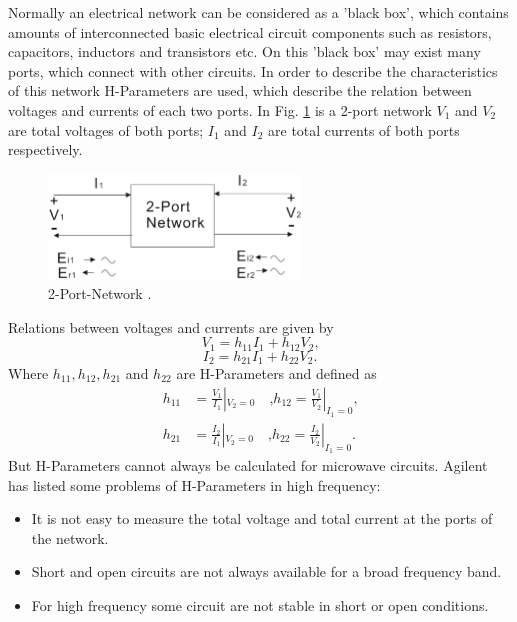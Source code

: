 Normally an electrical network can be considered as a 'black box', which contains amounts of interconnected basic electrical circuit components such as resistors, capacitors, inductors and transistors etc. On this 'black box' may exist many ports, which connect with other circuits. In order to describe the characteristics of this network H-Parameters are used, which describe the relation between voltages and currents of each two ports. In Fig. \ref{fig:2_port_network} is a 2-port network $V_{1}$ and $V_{2}$ are total voltages of both ports; $I_{1}$ and $I_{2}$ are total currents of both ports respectively.\\
 
\begin{figure}[!ht]
\centering
\includegraphics[width=0.6\textwidth]{bilder/s_parameters}
\caption{2-Port-Network \cite{aglient_s_parameters}.}
\label{fig:2_port_network}
\end{figure}
Relations between voltages and currents are given by %
\begin{equation}
V_{1}=h_{11}I_{1}+h_{12}V_{2} \text{,}
\label{eq:voltage_current1}
\end{equation}
\begin{equation}
I_{2}=h_{21}I_{1}+h_{22}V_{2} \text{.}
\label{eq:voltage_current2}
\end{equation}
Where $h_{11},h_{12},h_{21}$ and $h_{22}$ are H-Parameters and defined as %
\begin{align}
h_{11}&=\frac{V_{1}}{I_{1}}|_{V_{2}=0}\quad\text{,} h_{12}=\frac{V_{1}}{V_{2}}|_{I_{1}=0}\text{,}
\label{eq:h_parameters1}\\
h_{21}&=\frac{I_{2}}{I_{1}}|_{V_{2}=0}\quad\text{,} h_{22}=\frac{I_{2}}{V_{2}}|_{I_{1}=0}\text{.}
\label{eq:h_parameters2}
\end{align}
But H-Parameters cannot always be calculated for microwave circuits. Agilent\cite{aglient_s_parameters} has listed some problems of H-Parameters in high frequency:
\begin{itemize}
\item It is not easy to measure the total voltage and total current at the ports of the network.
\item Short and open circuits are not always available for a broad frequency band.
\item For high frequency some circuit are not stable in short or open conditions.
\end{itemize}
